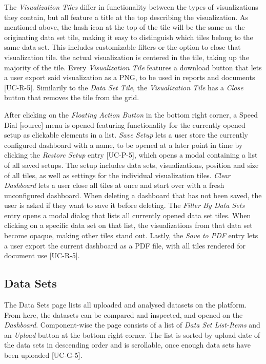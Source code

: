The \emph{Visualization Tiles} differ in functionality between the types of visualizations they contain, but all feature a title at the top describing the visualization. As mentioned above, the hash icon at the top of the tile will be the same as the originating data set tile, making it easy to distinguish which tiles belong to the same data set. This includes customizable filters or the option to close that visualization tile. the actual visualization is centered in the tile, taking up the majority of the tile. Every \emph{Visualization Tile} features a download button that lets a user export said visualization as a PNG, to be used in reports and documents [UC-R-5]. Similarily to the \emph{Data Set Tile}, the \emph{Visualization Tile} has a \emph{Close} button that removes the tile from the grid.

After clicking on the \emph{Floating Action Button} in the bottom right corner, a Speed Dial [source] menu is opened featuring functionality for the currently opened setup as clickable elements in a list.
\emph{Save Setup} lets a user store the currently configured dashboard with a name, to be opened at a later point in time by clicking the \emph{Restore Setup} entry [UC-P-5], which opens a modal containing a list of all saved setups. The setup includes data sets, visualizations, position and size of all tiles, as well as settings for the individual visualization tiles. \emph{Clear Dashboard} lets a user close all tiles at once and start over with a fresh unconfigured dashboard. When deleting a dashboard that has not been saved, the user is asked if they want to save it before deleting. The \emph{Filter By Data Sets} entry opens a modal dialog that lists all currently opened data set tiles. When clicking on a specific data set on that list, the visualizations from that data set become opaque, making other tiles stand out. Lastly, the \emph{Save to PDF} entry lets a user export the current dashboard as a PDF file, with all tiles rendered for document use [UC-R-5].

\subsection{Data Sets}
The Data Sets page lists all uploaded and analysed datasets on the platform. From here, the datasets can be compared and inspected, and opened on the \emph{Dashboard}. Component-wise the page consists of a list of \emph{Data Set List-Items} and an \emph{Upload} button at the bottom right corner. The list is sorted by upload date of the data sets in descending order and is scrollable, once enough data sets have been uploaded [UC-G-5].

